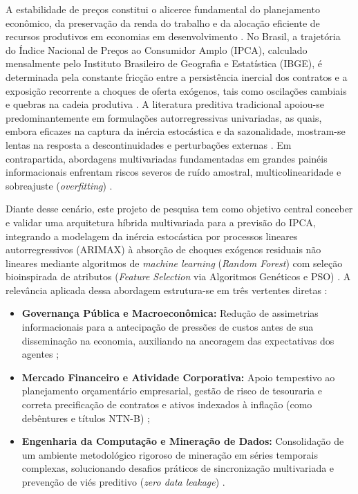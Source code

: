 \documentclass[10pt,twoside]{article}
\begin{document}
A estabilidade de preços constitui o alicerce fundamental do planejamento econômico, da preservação da renda do trabalho e da alocação eficiente de recursos produtivos em economias em desenvolvimento \cite{ref4, ref16}. No Brasil, a trajetória do Índice Nacional de Preços ao Consumidor Amplo (IPCA), calculado mensalmente pelo Instituto Brasileiro de Geografia e Estatística (IBGE), é determinada pela constante fricção entre a persistência inercial dos contratos e a exposição recorrente a choques de oferta exógenos, tais como oscilações cambiais e quebras na cadeia produtiva \cite{ref5, ref10, ref14}. A literatura preditiva tradicional apoiou-se predominantemente em formulações autorregressivas univariadas, as quais, embora eficazes na captura da inércia estocástica e da sazonalidade, mostram-se lentas na resposta a descontinuidades e perturbações externas \cite{ref1, ref9}. Em contrapartida, abordagens multivariadas fundamentadas em grandes painéis informacionais enfrentam riscos severos de ruído amostral, multicolinearidade e sobreajuste (\textit{overfitting}) \cite{ref6, ref14}.

Diante desse cenário, este projeto de pesquisa tem como objetivo central conceber e validar uma arquitetura híbrida multivariada para a previsão do IPCA, integrando a modelagem da inércia estocástica por processos lineares autorregressivos (ARIMAX) à absorção de choques exógenos residuais não lineares mediante algoritmos de \textit{machine learning} (\textit{Random Forest}) com seleção bioinspirada de atributos (\textit{Feature Selection} via Algoritmos Genéticos e PSO) \cite{ref7, ref8, ref11, ref18}. A relevância aplicada dessa abordagem estrutura-se em três vertentes diretas \cite{ref2, ref12}:
\begin{itemize}[leftmargin=1.5em]
    \item \textbf{Governança Pública e Macroeconômica:} Redução de assimetrias informacionais para a antecipação de pressões de custos antes de sua disseminação na economia, auxiliando na ancoragem das expectativas dos agentes \cite{ref2, ref3};
    \item \textbf{Mercado Financeiro e Atividade Corporativa:} Apoio tempestivo ao planejamento orçamentário empresarial, gestão de risco de tesouraria e correta precificação de contratos e ativos indexados à inflação (como debêntures e títulos NTN-B) \cite{ref12, ref17};
    \item \textbf{Engenharia da Computação e Mineração de Dados:} Consolidação de um ambiente metodológico rigoroso de mineração em séries temporais complexas, solucionando desafios práticos de sincronização multivariada e prevenção de viés preditivo (\textit{zero data leakage}) \cite{ref7, ref14}.
\end{itemize}
\end{document}
